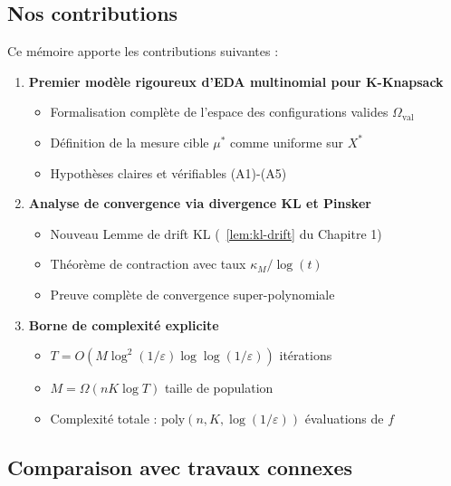 \documentclass[12pt,a4paper]{article}
\theoremstyle{definition}
\theoremstyle{remark}
\begin{document}
\subsection{Nos contributions}

Ce mémoire apporte les contributions suivantes :

\begin{enumerate}
    \item \textbf{Premier modèle rigoureux d'EDA multinomial pour K-Knapsack}
    \begin{itemize}
        \item Formalisation complète de l'espace des configurations valides $\Omega_{\text{val}}$
        \item Définition de la mesure cible $\mu^*$ comme uniforme sur $X^*$
        \item Hypothèses claires et vérifiables (A1)-(A5)
    \end{itemize}
    
    \item \textbf{Analyse de convergence via divergence KL et Pinsker}
    \begin{itemize}
        \item Nouveau Lemme de drift KL (~\ref{lem:kl-drift} du Chapitre 1)
        \item Théorème de contraction avec taux $\kappa_M / \log(t)$
        \item Preuve complète de convergence super-polynomiale
    \end{itemize}
    
    \item \textbf{Borne de complexité explicite}
    \begin{itemize}
        \item $T = O(M \log^2(1/\varepsilon) \log\log(1/\varepsilon))$ itérations
        \item $M = \Omega(nK \log T)$ taille de population
        \item Complexité totale : $\text{poly}(n, K, \log(1/\varepsilon))$ évaluations de $f$
    \end{itemize}
    
\end{enumerate}

\subsection{Comparaison avec travaux connexes}
\end{document}
